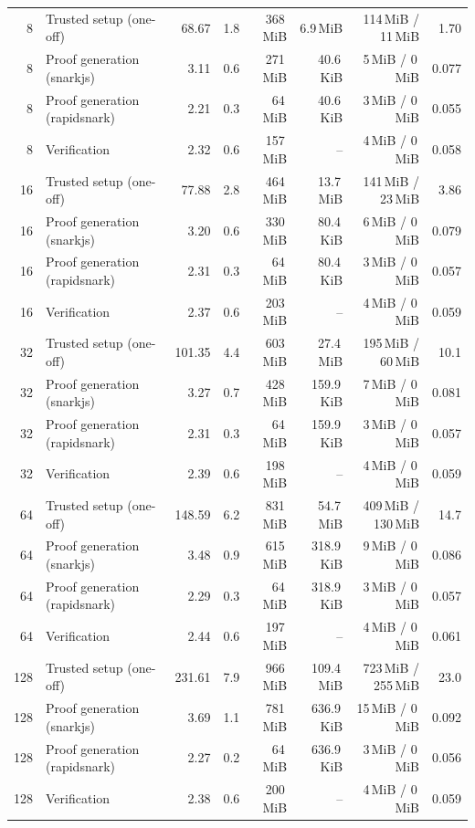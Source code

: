 \begin{table}[t]
{\begin{tabular}{|r|l|r|r|r|r|r|r|}
\hline
8 & Trusted setup (one-off) & 68.67 & 1.8 & 368\,MiB & 6.9\,MiB & 114\,MiB / 11\,MiB & 1.70 \\
8 & Proof generation (snarkjs) & 3.11 & 0.6 & 271\,MiB & 40.6\,KiB & 5\,MiB / 0\,MiB & 0.077 \\
8 & Proof generation (rapidsnark) & 2.21 & 0.3 & 64\,MiB & 40.6\,KiB & 3\,MiB / 0\,MiB & 0.055 \\
8 & Verification & 2.32 & 0.6 & 157\,MiB & -- & 4\,MiB / 0\,MiB & 0.058 \\
\hline
16 & Trusted setup (one-off) & 77.88 & 2.8 & 464\,MiB & 13.7\,MiB & 141\,MiB / 23\,MiB & 3.86 \\
16 & Proof generation (snarkjs) & 3.20 & 0.6 & 330\,MiB & 80.4\,KiB & 6\,MiB / 0\,MiB & 0.079 \\
16 & Proof generation (rapidsnark) & 2.31 & 0.3 & 64\,MiB & 80.4\,KiB & 3\,MiB / 0\,MiB & 0.057 \\
16 & Verification & 2.37 & 0.6 & 203\,MiB & -- & 4\,MiB / 0\,MiB & 0.059 \\
\hline
32 & Trusted setup (one-off) & 101.35 & 4.4 & 603\,MiB & 27.4\,MiB & 195\,MiB / 60\,MiB & 10.1 \\
32 & Proof generation (snarkjs) & 3.27 & 0.7 & 428\,MiB & 159.9\,KiB & 7\,MiB / 0\,MiB & 0.081 \\
32 & Proof generation (rapidsnark) & 2.31 & 0.3 & 64\,MiB & 159.9\,KiB & 3\,MiB / 0\,MiB & 0.057 \\
32 & Verification & 2.39 & 0.6 & 198\,MiB & -- & 4\,MiB / 0\,MiB & 0.059 \\
\hline
64 & Trusted setup (one-off) & 148.59 & 6.2 & 831\,MiB & 54.7\,MiB & 409\,MiB / 130\,MiB & 14.7 \\
64 & Proof generation (snarkjs) & 3.48 & 0.9 & 615\,MiB & 318.9\,KiB & 9\,MiB / 0\,MiB & 0.086 \\
64 & Proof generation (rapidsnark) & 2.29 & 0.3 & 64\,MiB & 318.9\,KiB & 3\,MiB / 0\,MiB & 0.057 \\
64 & Verification & 2.44 & 0.6 & 197\,MiB & -- & 4\,MiB / 0\,MiB & 0.061 \\
\hline
128 & Trusted setup (one-off) & 231.61 & 7.9 & 966\,MiB & 109.4\,MiB & 723\,MiB / 255\,MiB & 23.0 \\
128 & Proof generation (snarkjs) & 3.69 & 1.1 & 781\,MiB & 636.9\,KiB & 15\,MiB / 0\,MiB & 0.092 \\
128 & Proof generation (rapidsnark) & 2.27 & 0.2 & 64\,MiB & 636.9\,KiB & 3\,MiB / 0\,MiB & 0.056 \\
128 & Verification & 2.38 & 0.6 & 200\,MiB & -- & 4\,MiB / 0\,MiB & 0.059 \\
\hline
\end{tabular}}
\end{table}
